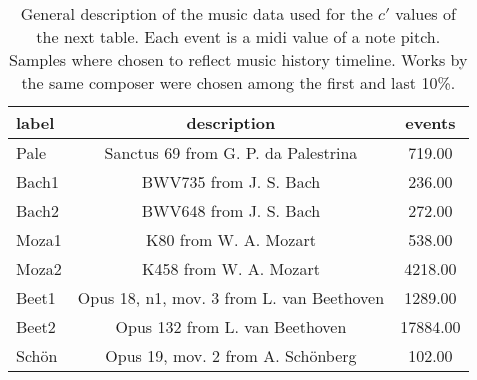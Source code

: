 \begin{table}[h!]
\begin{center}
\begin{tabular}{| l | c | c |}\hline
label & description & events \\\hline
Pale & Sanctus 69 from G. P. da Palestrina  & 719.00 \\\hline
Bach1 & BWV735 from J. S. Bach  & 236.00 \\\hline
Bach2 & BWV648 from J. S. Bach  & 272.00 \\\hline
Moza1 & K80 from W. A. Mozart  & 538.00 \\\hline
Moza2 & K458 from W. A. Mozart  & 4218.00 \\\hline
Beet1 & Opus 18, n1, mov. 3 from L. van Beethoven  & 1289.00 \\\hline
Beet2 & Opus 132 from L. van Beethoven  & 17884.00 \\\hline
Sch\"on & Opus 19, mov. 2 from A. Sch\"onberg  & 102.00 \\\hline
\end{tabular}
\caption{General description of the music data used for the $c'$ values of the next table. Each event is a midi value of a note pitch. Samples where chosen to reflect music history timeline. Works by the same composer were chosen among the first and last 10\%.}
\end{center}
\end{table}